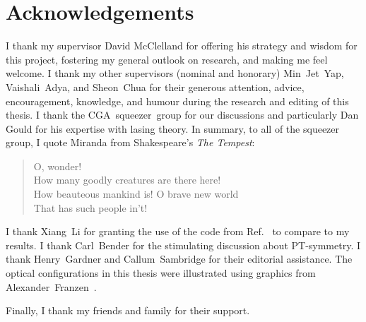 \chapter*{Acknowledgements}

I thank my supervisor David McClelland for offering his strategy and wisdom for this project, fostering my general outlook on research, and making me feel welcome.
I thank my other supervisors (nominal and honorary) Min~Jet~Yap, Vaishali~Adya, and Sheon~Chua for their generous attention, advice, encouragement, knowledge, and humour during the research and editing of this thesis.
I thank the CGA~squeezer~group for our discussions and particularly Dan Gould for his expertise with lasing theory. %
In summary, to all of the squeezer group, I quote Miranda from Shakespeare's \emph{The Tempest}:
\begin{quote}
O, wonder! \\ How many goodly creatures are there here! \\ How beauteous mankind is! O brave new world \\ That has such people in't!
\end{quote}

I thank Xiang~Li for granting the use of the code from Ref.~\cite{liBroadbandSensitivityImprovement2020} to compare to my results. I thank Carl~Bender for the stimulating discussion about PT-symmetry.
I thank Henry~Gardner and Callum~Sambridge for their editorial assistance.
The optical configurations in this thesis were illustrated using graphics from Alexander~Franzen~\cite{ComponentLibrary}.

Finally, I thank my friends and family for their support.


